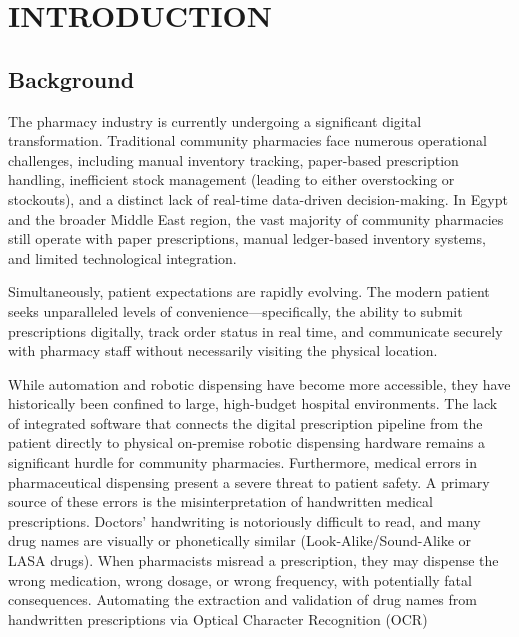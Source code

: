 \documentclass[12pt,a4paper,oneside]{report}
\begin{document}
\clearpage
\tableofcontents

\clearpage
{}
\listoffigures

\clearpage
{}
\listoftables

\clearpage


\chapter{INTRODUCTION}\label{introduction}

\section{Background}\label{background}

The pharmacy industry is currently undergoing a significant digital
transformation. Traditional community pharmacies face numerous
operational challenges, including manual inventory tracking, paper-based
prescription handling, inefficient stock management (leading to either
overstocking or stockouts), and a distinct lack of real-time data-driven
decision-making. In Egypt and the broader Middle East region, the vast
majority of community pharmacies still operate with paper prescriptions,
manual ledger-based inventory systems, and limited technological
integration.

Simultaneously, patient expectations are rapidly evolving. The modern
patient seeks unparalleled levels of convenience---specifically, the
ability to submit prescriptions digitally, track order status in real
time, and communicate securely with pharmacy staff without necessarily
visiting the physical location.

While automation and robotic dispensing have become more accessible,
they have historically been confined to large, high-budget hospital
environments. The lack of integrated software that connects the digital
prescription pipeline from the patient directly to physical on-premise
robotic dispensing hardware remains a significant hurdle for community
pharmacies. Furthermore, medical errors in pharmaceutical dispensing
present a severe threat to patient safety. A primary source of these
errors is the misinterpretation of handwritten medical prescriptions.
Doctors' handwriting is notoriously difficult to read, and many drug
names are visually or phonetically similar (Look-Alike/Sound-Alike or
LASA drugs). When pharmacists misread a prescription, they may dispense
the wrong medication, wrong dosage, or wrong frequency, with potentially
fatal consequences. Automating the extraction and validation of drug
names from handwritten prescriptions via Optical Character Recognition
(OCR)
\end{document}
